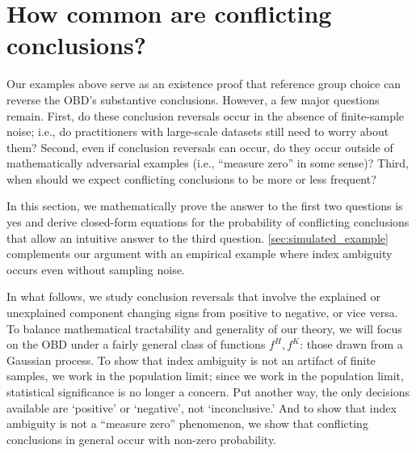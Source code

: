 \section{How common are conflicting conclusions?} 
\label{sec:signflips}

Our examples above serve as an existence proof that reference group choice can reverse the OBD's substantive conclusions.
However, a few major questions remain.
First, do these conclusion reversals occur in the absence of finite-sample noise; i.e., do practitioners with large-scale datasets still need to worry about them?
Second, even if conclusion reversals can occur, do they occur outside of mathematically adversarial examples (i.e., ``measure zero'' in some sense)?
Third, when should we expect conflicting conclusions to be more or less frequent?

In this section, we mathematically prove the answer to the first two questions is yes and derive closed-form equations for the probability of conflicting conclusions that allow an intuitive answer to the third question.
\cref{sec:simulated_example} complements our argument with an empirical example where index ambiguity occurs even without sampling noise.

In what follows, we study conclusion reversals that involve the explained or unexplained component changing signs from positive to negative, or vice versa.
To balance mathematical tractability and generality of our theory, we will focus on the OBD under a fairly general class of functions $f^H, f^K$: those drawn from a Gaussian process.
To show that index ambiguity is not an artifact of finite samples, we work in the population limit; since we work in the population limit, statistical significance is no longer a concern.
Put another way, the only decisions available are `positive' or `negative', not `inconclusive.'
And to show that index ambiguity is not a ``measure zero'' phenomenon, we show that conflicting conclusions in general occur with non-zero probability.

